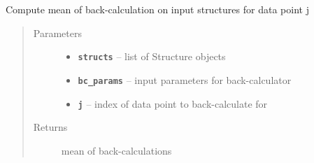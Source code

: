 \documentclass[letterpaper,10pt,english]{sphinxmanual}
\begin{document}
\begin{fulllineitems}

\begin{fulllineitems}
\label{modules:eisd.DataEISD.compute_back_calc_mean}
Compute mean of back-calculation on input structures for data point j
\begin{quote}\begin{description}
\item[{Parameters}] \leavevmode\begin{itemize}
\item {} 
\textbf{\texttt{structs}} -- list of Structure objects

\item {} 
\textbf{\texttt{bc\_params}} -- input parameters for back-calculator

\item {} 
\textbf{\texttt{j}} -- index of data point to back-calculate for

\end{itemize}

\item[{Returns}] \leavevmode
mean of back-calculations

\end{description}\end{quote}

\end{fulllineitems}


\end{fulllineitems}

\end{document}
